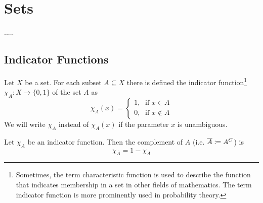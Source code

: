 \section{Sets}\label{sec-sets}


.....

\subsection{Indicator Functions}\label{subsec-indicator-functions}

\begin{definition}\label{def-indicator-function}
    Let $X$ be a set. For each subset $A \subseteq X$ there is defined the 
    indicator function\footnote{Sometimes, the term characteristic function is 
    used to describe the function that indicates membership in a set in other 
    fields of mathematics. The term indicator function is more prominently used 
    in probability theory.} $\chi_A:X\rightarrow \{0,1\}$ of the set $A$ as
    \begin{equation}
        \chi_A(x) = \begin{cases}
            1,\;\text{ if } x \in A \\
            0,\;\text{ if } x \notin A
        \end{cases}
    \end{equation}
    We will write $\chi_A$ instead of $\chi_A(x)$ if the parameter
    $x$ is unambiguous.
\end{definition}

\begin{thm}\label{thm-complement-indicator-function}
    Let $\chi_A$ be an indicator function. Then the complement of $A$ (i.e. 
    $\overline{A} \coloneqq A^C$) is
    \begin{equation*}
        \chi_{\overline{A}} = 1 - \chi_A
    \end{equation*}
\end{thm}

